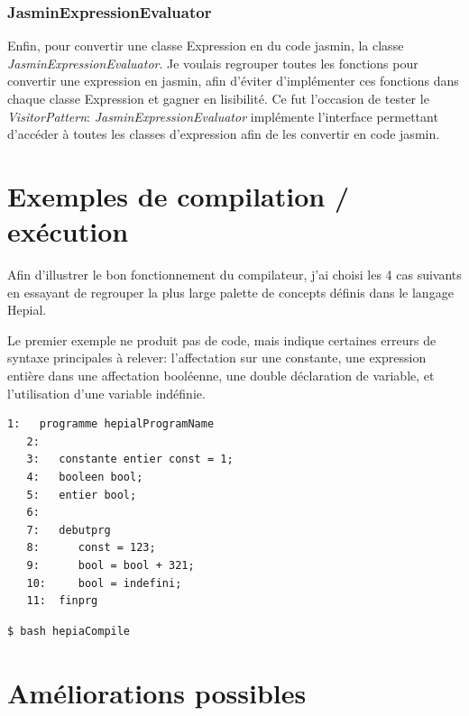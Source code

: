 \documentclass[11pt,a4paper]{article}
\begin{document}
  \subsubsection{JasminExpressionEvaluator}
  
  \par Enfin, pour convertir une classe Expression en du code jasmin, la classe \textit{JasminExpressionEvaluator}. Je voulais regrouper toutes les fonctions pour convertir une expression en jasmin, afin d'éviter d'implémenter ces fonctions dans chaque classe Expression et gagner en lisibilité. Ce fut l'occasion de tester le \textit{VisitorPattern}: \textit{JasminExpressionEvaluator} implémente l'interface permettant d'accéder à toutes les classes d'expression afin de les convertir en code jasmin. 
  
  \section{Exemples de compilation / exécution}
  
  \par Afin d'illustrer le bon fonctionnement du compilateur, j'ai choisi les 4 cas suivants en essayant de regrouper la plus large palette de concepts définis dans le langage Hepial. 
  
  \par Le premier exemple ne produit pas de code, mais indique certaines erreurs de syntaxe principales à relever: l'affectation sur une constante, une expression entière dans une affectation booléenne, une double déclaration de variable, et l'utilisation d'une variable indéfinie. 
  
   \begin{lstlisting}[caption={Code Hepial pour tester les erreurs sémantiques}]
   1:   programme hepialProgramName
   2:   
   3:   constante entier const = 1;
   4:   booleen bool;
   5:   entier bool;
   6:   
   7:   debutprg
   8:      const = 123;
   9:      bool = bool + 321;
   10:     bool = indefini;
   11:  finprg
   \end{lstlisting} 
   
   \begin{lstlisting}[language=bash,caption={Code Hepial pour tester les erreurs sémantiques}]
   $ bash hepiaCompile
   \end{lstlisting} 
  
  \section{Améliorations possibles}
   
\end{document}
